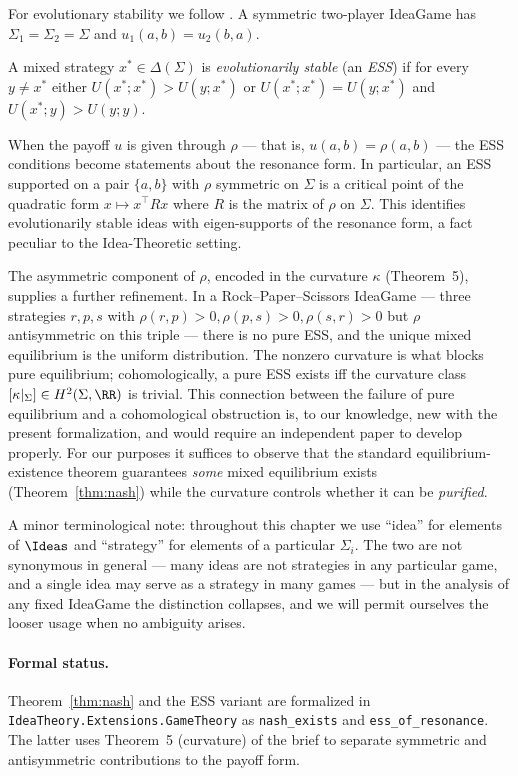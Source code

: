 For evolutionary stability we follow \citet{MaynardSmith1982}. A symmetric
two-player IdeaGame has $\Sigma_1=\Sigma_2=\Sigma$ and $u_1(a,b)=u_2(b,a)$.

\begin{definition}
A mixed strategy $x^\ast \in \Delta(\Sigma)$ is \emph{evolutionarily stable}
(an \emph{ESS}) if for every $y\neq x^\ast$ either
$U(x^\ast;x^\ast) > U(y;x^\ast)$ or
$U(x^\ast;x^\ast) = U(y;x^\ast)$ and $U(x^\ast;y) > U(y;y)$.
\end{definition}

When the payoff $u$ is given through $\rho$ — that is,
$u(a,b) = \rho(a,b)$ — the ESS conditions become statements about the
resonance form. In particular, an ESS supported on a pair $\{a,b\}$ with
$\rho$ symmetric on $\Sigma$ is a critical point of the quadratic form
$x\mapsto x^\top R x$ where $R$ is the matrix of $\rho$ on $\Sigma$.
This identifies evolutionarily stable ideas with eigen-supports of the
resonance form, a fact peculiar to the Idea-Theoretic setting.

The asymmetric component of $\rho$, encoded in the curvature $\kappa$
(Theorem~5), supplies a further refinement. In a Rock--Paper--Scissors
IdeaGame — three strategies $r,p,s$ with $\rho(r,p)>0,\rho(p,s)>0,
\rho(s,r)>0$ but $\rho$ antisymmetric on this triple — there is no pure
ESS, and the unique mixed equilibrium is the uniform distribution. The
nonzero curvature is what blocks pure equilibrium; cohomologically, a
pure ESS exists iff the curvature class
$[\kappa|_{\Sigma}]\in H^2(\Sigma,\RR)$ is trivial. This connection
between the failure of pure equilibrium and a cohomological obstruction
is, to our knowledge, new with the present formalization, and would
require an independent paper to develop properly. For our purposes it
suffices to observe that the standard equilibrium-existence theorem
guarantees \emph{some} mixed equilibrium exists (Theorem~\ref{thm:nash})
while the curvature controls whether it can be \emph{purified}.

A minor terminological note: throughout this chapter we use ``idea'' for
elements of $\Ideas$ and ``strategy'' for elements of a particular
$\Sigma_i$. The two are not synonymous in general — many ideas are not
strategies in any particular game, and a single idea may serve as a
strategy in many games — but in the analysis of any fixed IdeaGame the
distinction collapses, and we will permit ourselves the looser usage
when no ambiguity arises.

\paragraph{Formal status.} Theorem~\ref{thm:nash} and the ESS variant are
formalized in \texttt{IdeaTheory.Extensions.GameTheory} as
\texttt{nash\_exists} and \texttt{ess\_of\_resonance}. The latter uses
Theorem~5 (curvature) of the brief to separate symmetric and antisymmetric
contributions to the payoff form.

